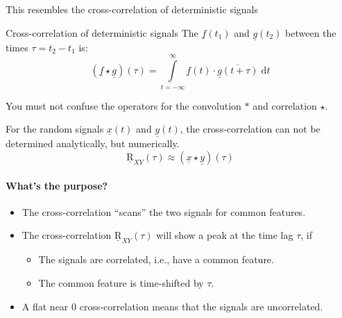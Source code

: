 \begin{refsection}
This resembles the cross-correlation of deterministic signals
\begin{definition}{Cross-correlation of deterministic signals}
	The   $\underline{f}(t_1)$ and $\underline{g}(t_2)$ between the times $\tau = t_2 - t_1$ is:
	\begin{equation}
		\left(\underline{f} \star \underline{g}\right)(\tau) = \int\limits_{t = -\infty}^{\infty} \underline{f}(t) \cdot \overline{\underline{g}(t+\tau)} \; \mathrm{d} t
	\end{equation}%
\end{definition}

\begin{attention}
	You must not confuse the operators for the convolution $*$ and correlation $\star$.
\end{attention}

For the random signals $\underline{x}(t)$ and $\underline{y}(t)$, the cross-correlation can not be determined analytically, but numerically.
\begin{equation}
	\underline{\mathrm{R}}_{XY}(\tau) \approx \left(\underline{x} \star \underline{y}\right)(\tau)
\end{equation}

\paragraph{What's the purpose?}

\begin{itemize}
	\item The cross-correlation ``scans'' the two signals for common features.
	\item The cross-correlation $\underline{\mathrm{R}}_{XY}(\tau)$ will show a peak at the time lag $\tau$, if
	\begin{itemize}
		\item The signals are correlated, i.e., have a common feature.
		\item The common feature is time-shifted by $\tau$.
	\end{itemize}
	\item A flat near $0$ cross-correlation means that the signals are uncorrelated.
\end{itemize}


\end{refsection}
